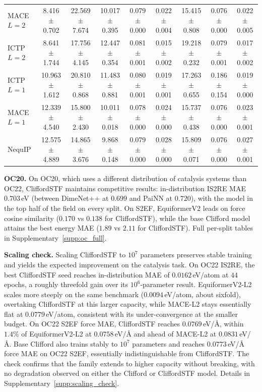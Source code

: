 \begin{table}[t]
{\begin{tabular}{lcccccccc}
MACE $L{=}2$       & 8.416 $\pm$ 0.702 & 22.569 $\pm$ 7.674 & 10.017 $\pm$ 0.395 & 0.079 $\pm$ 0.000 & 0.022 $\pm$ 0.004 & 15.415 $\pm$ 0.808 & 0.076 $\pm$ 0.000 & 0.022 $\pm$ 0.005 \\
ICTP $L{=}2$       & 8.641 $\pm$ 1.744 & 17.756 $\pm$ 4.145 & 12.447 $\pm$ 0.354 & 0.081 $\pm$ 0.001 & 0.015 $\pm$ 0.002 & 19.218 $\pm$ 0.232 & 0.079 $\pm$ 0.001 & 0.017 $\pm$ 0.002 \\
ICTP $L{=}1$       & 10.963 $\pm$ 1.612 & 20.810 $\pm$ 0.868 & 11.483 $\pm$ 0.881 & 0.080 $\pm$ 0.001 & 0.019 $\pm$ 0.001 & 17.263 $\pm$ 0.655 & 0.186 $\pm$ 0.154 & 0.019 $\pm$ 0.000 \\
MACE $L{=}1$       & 12.339 $\pm$ 4.540 & 15.800 $\pm$ 2.430 & 10.011 $\pm$ 0.018 & 0.078 $\pm$ 0.000 & 0.024 $\pm$ 0.000 & 15.737 $\pm$ 0.438 & 0.076 $\pm$ 0.000 & 0.023 $\pm$ 0.001 \\
NequIP             & 12.575 $\pm$ 4.889 & 14.865 $\pm$ 3.676 & 9.868 $\pm$ 0.148 & 0.079 $\pm$ 0.000 & 0.028 $\pm$ 0.000 & 15.809 $\pm$ 0.071 & 0.076 $\pm$ 0.000 & 0.027 $\pm$ 0.001 \\
\bottomrule
\end{tabular}%
}
\end{table}

\textbf{OC20.} On OC20, which uses a different distribution of catalysis systems than OC22, CliffordSTF maintains competitive results: in-distribution IS2RE MAE $0.703$\,eV (between DimeNet++ at $0.699$ and PaiNN at $0.720$), with the model in the top half of the field on every split. On S2EF, EquiformerV2 leads on force cosine similarity ($0.170$ vs $0.138$ for CliffordSTF), while the base Clifford model attains the best energy MAE ($1.89$ vs $2.11$ for CliffordSTF). Full per-split tables in Supplementary~\ref{supp:oc_full}.

\textbf{Scaling check.} Scaling CliffordSTF to $10^7$ parameters preserves stable training and yields the expected improvement on the catalysis task. On OC22 IS2RE, the best CliffordSTF seed reaches in-distribution MAE of $0.0162$\,eV/atom at $44$ epochs, a roughly threefold gain over its $10^6$-parameter result. EquiformerV2-L2 scales more steeply on the same benchmark ($0.0094$\,eV/atom, about sixfold), overtaking CliffordSTF at this larger capacity, while MACE-L2 stays essentially flat at $0.0779$\,eV/atom, consistent with its under-convergence at the smaller budget. On OC22 S2EF force MAE, CliffordSTF reaches $0.0769$\,eV/\AA{}, within $1.4\%$ of EquiformerV2-L2 at $0.0758$\,eV/\AA{} and ahead of MACE-L2 at $0.0831$\,eV/\AA{}. Base Clifford also trains stably to $10^7$ parameters and reaches $0.0773$\,eV/\AA{} force MAE on OC22 S2EF, essentially indistinguishable from CliffordSTF. The check confirms that the family extends to higher capacity without breaking, with no degradation observed on either the Clifford or CliffordSTF model. Details in Supplementary~\ref{supp:scaling_check}.

